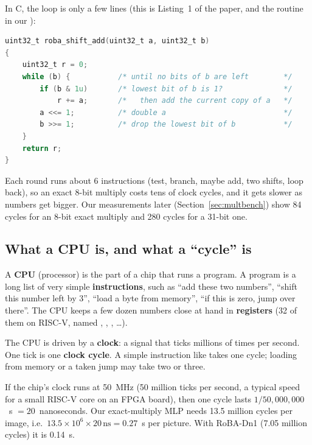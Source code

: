 In C, the loop is only a few lines (this is Listing~1 of the paper, and the routine
 in our ):

\begin{lstlisting}[language=C]
uint32_t roba_shift_add(uint32_t a, uint32_t b)
{
    uint32_t r = 0;
    while (b) {           /* until no bits of b are left        */
        if (b & 1u)       /* lowest bit of b is 1?              */
            r += a;       /*   then add the current copy of a   */
        a <<= 1;          /* double a                           */
        b >>= 1;          /* drop the lowest bit of b           */
    }
    return r;
}
\end{lstlisting}

Each round runs about 6 instructions (test, branch, maybe add, two shifts, loop back), so an
exact 8-bit multiply costs tens of clock cycles, and it gets slower as numbers get bigger.
Our measurements later (Section~\ref{sec:multbench}) show 84 cycles for an 8-bit exact multiply
and 280 cycles for a 31-bit one.

\subsection{What a CPU is, and what a ``cycle'' is}

A \textbf{CPU} (processor) is the part of a chip that runs a program. A program is a long list of
very simple \textbf{instructions}, such as ``add these two numbers'', ``shift this number left by 3'',
``load a byte from memory'', ``if this is zero, jump over there''. The CPU keeps a few dozen
numbers close at hand in \textbf{registers} (32 of them on RISC-V, named , ,
, \dots).

The CPU is driven by a \textbf{clock}: a signal that ticks millions of times per second. One tick is
one \textbf{clock cycle}. A simple instruction like  takes one cycle; loading from memory
or a taken jump may take two or three.

\begin{example}
If the chip's clock runs at 50~MHz (50 million ticks per second, a typical speed for a small
RISC-V core on an FPGA board), then one cycle lasts $1/50{,}000{,}000$~s $=20$~nanoseconds.
Our exact-multiply MLP needs 13.5 million cycles per image, i.e.\ $13.5\times 10^6 \times 20\,
\text{ns} = 0.27$~s per picture. With RoBA-Dn1 (7.05 million cycles) it is 0.14~s.
\end{example}

